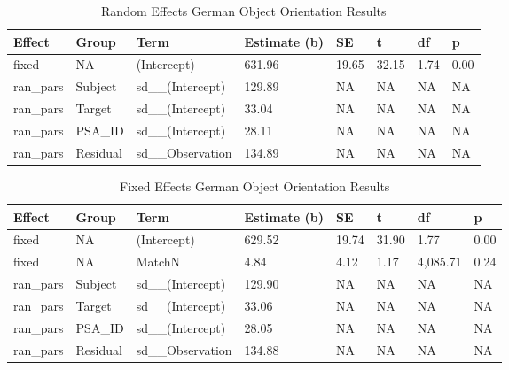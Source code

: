 \documentclass[
  man,floatsintext]{apa7}
\begin{document}
\begin{table}[tbp]

\begin{center}
\begin{threeparttable}

\caption{\label{tab:german-random}Random Effects German Object Orientation Results}

\begin{tabular}{llllllll}
\toprule
Effect & Group & Term & Estimate (b) & SE & t & df & p\\
\midrule
fixed & NA & (Intercept) & 631.96 & 19.65 & 32.15 & 1.74 & 0.00\\
ran\_pars & Subject & sd\_\_(Intercept) & 129.89 & NA & NA & NA & NA\\
ran\_pars & Target & sd\_\_(Intercept) & 33.04 & NA & NA & NA & NA\\
ran\_pars & PSA\_ID & sd\_\_(Intercept) & 28.11 & NA & NA & NA & NA\\
ran\_pars & Residual & sd\_\_Observation & 134.89 & NA & NA & NA & NA\\
\bottomrule
\end{tabular}

\end{threeparttable}
\end{center}

\end{table}

\begin{table}[tbp]

\begin{center}
\begin{threeparttable}

\caption{\label{tab:german-fixed}Fixed Effects German Object Orientation Results}

\begin{tabular}{llllllll}
\toprule
Effect & Group & Term & Estimate (b) & SE & t & df & p\\
\midrule
fixed & NA & (Intercept) & 629.52 & 19.74 & 31.90 & 1.77 & 0.00\\
fixed & NA & MatchN & 4.84 & 4.12 & 1.17 & 4,085.71 & 0.24\\
ran\_pars & Subject & sd\_\_(Intercept) & 129.90 & NA & NA & NA & NA\\
ran\_pars & Target & sd\_\_(Intercept) & 33.06 & NA & NA & NA & NA\\
ran\_pars & PSA\_ID & sd\_\_(Intercept) & 28.05 & NA & NA & NA & NA\\
ran\_pars & Residual & sd\_\_Observation & 134.88 & NA & NA & NA & NA\\
\bottomrule
\end{tabular}

\end{threeparttable}
\end{center}

\end{table}
\end{document}

